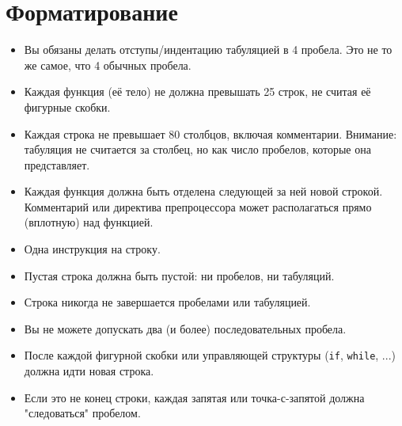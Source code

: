 \documentclass{42-ru}
\begin{document}
    \newpage


    \section{Форматирование}

            \begin{itemize}

                \item Вы обязаны делать отступы/индентацию табуляцией в 4 пробела. Это не то же самое, что 4 обычных пробела.

                \item Каждая функция (её тело) не должна превышать 25 строк, не считая её фигурные скобки.

                \item Каждая строка не превышает 80 столбцов, включая комментарии. Внимание: табуляция не считается за столбец, но как число пробелов, которые она представляет.

                \item Каждая функция должна быть отделена следующей за ней новой строкой. Комментарий или директива препроцессора может располагаться прямо (вплотную) над функцией.

                \item Одна инструкция на строку.

                \item Пустая строка должна быть пустой: ни пробелов, ни табуляций.

                \item Строка никогда не завершается пробелами или табуляцией.

                \item Вы не можете допускать два (и более) последовательных пробела.

                \item После каждой фигурной скобки или управляющей структуры (\texttt{if}, \texttt{while}, ...) должна идти новая строка.

                \item Если это не конец строки, каждая запятая или точка-с-запятой должна "следоваться" пробелом.


\end{itemize}
\end{document}
